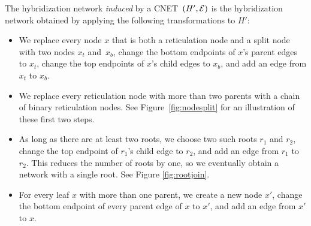 The hybridization network \emph{induced} by a CNET~$(H', \mathcal{E})$ is the hybridization network obtained by applying the following transformations to $H'$:
  \begin{itemize}%
  \item We replace every node $x$ that is both a reticulation node and a split
    node with two nodes $x_t$ and~$x_b$, change the bottom endpoints of $x$'s
    parent edges to $x_t$, change the top endpoints of $x$'s child edges to
    $x_b$, and add an edge from $x_t$ to $x_b$.
  \item We replace every reticulation node with more than two parents with a
    chain of binary reticulation nodes. {See Figure~\ref{fig:nodesplit} for an illustration of these first two steps.}
  \item As long as there are at least two roots, we choose two such roots $r_1$
    and $r_2$, change the top endpoint of $r_1$'s child edge to $r_2$, and add
    an edge from $r_1$ to $r_2$. 
		This reduces the number of roots by one, so we eventually obtain a network
    with a single root. See Figure \ref{fig:rootjoin}.
\item For every leaf $x$ with more than one parent, we create a new
    node $x'$, change the bottom endpoint of every parent edge of $x$ to $x'$,
    and add an edge from $x'$ to $x$.
  \end{itemize}
	
